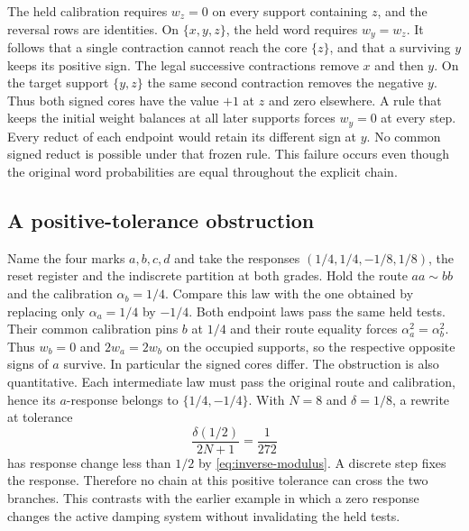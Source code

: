 The held calibration requires \(w_z=0\) on every support containing
\(z\), and the reversal rows are identities. On
\(\{x,y,z\}\), the held word requires \(w_y=w_z\).
It follows that a single contraction cannot reach the core
\(\{z\}\), and that a surviving \(y\) keeps its positive sign.
The legal successive contractions remove \(x\) and then \(y\).
On the target support \(\{y,z\}\) the same second contraction
removes the negative \(y\). Thus both signed cores have the value
\(+1\) at \(z\) and zero elsewhere.
A rule that keeps the initial weight balances at all later supports
forces \(w_y=0\) at every step. Every reduct of each endpoint would
retain its different sign at \(y\). No common signed reduct is possible
under that frozen rule. This failure occurs even though the original
word probabilities are equal throughout the explicit chain.


\subsection{A positive-tolerance obstruction}\label{sec:obstruction}

Name the four marks \(a,b,c,d\) and take the responses
\((1/4,1/4,-1/8,1/8)\), the reset register and the indiscrete
partition at both grades. Hold the route \(aa\sim bb\) and the
calibration \(\alpha_b=1/4\). Compare this law with the one obtained
by replacing only \(\alpha_a=1/4\) by \(-1/4\). Both endpoint laws
pass the same held tests. Their common calibration pins \(b\) at \(1/4\) and their
route equality forces \(\alpha_a^2=\alpha_b^2\). Thus \(w_b=0\)
and \(2w_a=2w_b\) on the occupied supports, so the respective
opposite signs of \(a\) survive. In particular the signed cores
differ. The obstruction is also quantitative. Each intermediate
law must pass the original route and calibration, hence its
\(a\)-response belongs to \(\{1/4,-1/4\}\). With \(N=8\) and
\(\delta=1/8\), a rewrite at tolerance
\[
 \frac{\delta(1/2)}{2N+1}=\frac1{272}
\]
has response change less than \(1/2\) by \eqref{eq:inverse-modulus}.
A discrete step fixes the response. Therefore no chain at this
positive tolerance can cross the two branches.
This contrasts with the earlier example in which a zero
response changes the active damping system without invalidating
the held tests.
